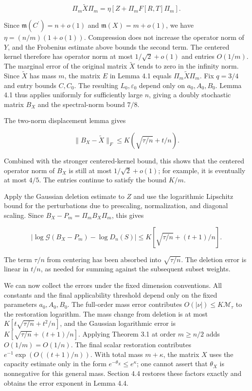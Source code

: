 \documentclass[11pt,a4paper]{article}
\begin{document}
\[
\Pi_m\widetilde X\Pi_m=\eta\left[Z+\Pi_mF[R,T]\Pi_m\right].
\]

Since \(\mathfrak m(C^{\prime})=n+o(1)\) and \(\mathfrak m(X)=m+o(1)\), we have \(\eta=(n/m)(1+o(1))\). Compression does not increase the operator norm of \(Y\), and the Frobenius estimate above bounds the second term. The centered kernel therefore has operator norm at most \(1/\sqrt2+o(1)\) and entries \(O(1/m)\). The marginal error of the original matrix \(\widetilde X\) tends to zero in the infinity norm. Since \(\widetilde X\) has mass \(m\), the matrix \(E\) in Lemma 4.1 equals \(\Pi_m\widetilde X\Pi_m\). Fix \(q=3/4\) and entry bounds \(C,C_0\). The resulting \(L_0,\varepsilon_0\) depend only on \(a_0,A_0,B_0\). Lemma 4.1 thus applies uniformly for sufficiently large \(n\), giving a doubly stochastic matrix \(B_X\) and the spectral-norm bound \(7/8\).

The two-norm displacement lemma gives

\[
\|B_X-\widetilde X\|_F\le K(\sqrt{\tau/n}+t/n).
\]

Combined with the stronger centered-kernel bound, this shows that the centered operator norm of \(B_X\) is still at most \(1/\sqrt2+o(1)\); for example, it is eventually at most \(4/5\). The entries continue to satisfy the bound \(K/m\).

Apply the Gaussian deletion estimate to \(Z\) and use the logarithmic Lipschitz bound for the perturbations due to prescaling, normalization, and diagonal scaling. Since \(B_X-P_m=\Pi_mB_X\Pi_m\), this gives

\[
|\log\mathcal G(B_X-P_m)-\log D_n(S)|\le K\left[\sqrt{\tau/n}+(t+1)/n\right].
\]

The term \(\tau/n\) from centering has been absorbed into \(\sqrt{\tau/n}\). The deletion error is linear in \(t/n\), as needed for summing against the subsequent subset weights.

We can now collect the errors under the fixed dimension conventions. All constants and the final applicability threshold depend only on the fixed parameters \(a_0,A_0,B_0\). The full-order mass error contributes \(O(|\nu|)\le K\mathcal M_\tau\) to the restoration logarithm. The mass change from deletion is at most \(K[t\sqrt{\tau/n}+t^2/n]\), and the Gaussian logarithmic error is \(K[\sqrt{\tau/n}+(t+1)/n]\). Applying Theorem 3.1 at order \(m\ge n/2\) adds \(O(1/m)=O(1/n)\). The final scalar restoration contributes \(e^{-1}\exp(O((t+1)/n))\). With total mass \(m+\kappa\), the matrix \(X\) uses the capacity estimate only in the form \(e^{-\theta_X}\le e^\kappa\); one cannot assert that \(\theta_X\) is nonnegative for this general mass. Section 4.4 restores these factors exactly and obtains the error exponent in Lemma 4.4.
\end{document}

